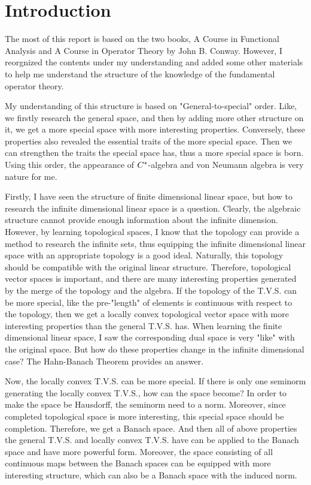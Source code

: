\chapter{Introduction}

The most of this report is based on the two books, A Course in Functional Analysis and A Course in Operator Theory by John B. Conway. However, I reorgnized the contents under my understanding and added some other materials to help me understand the structure of the knowledge of the fundamental operator theory.

 My understanding of this structure is based on "General-to-special" order. Like, we firstly research the general space, and then by adding more other structure on it, we get a more special space with more interesting properties. Conversely, these properties also revealed the essential traits of the more special space. Then we can strengthen the traits the special space has, thus a more special space is born. Using this order, the appearance of $C^{*}$-algebra and von Neumann algebra is very nature for me.

 Firstly, I have seen the structure of finite dimensional linear space, but how to research the infinite dimensional linear space is a question. Clearly, the algebraic structure cannot provide enough information about the infinite dimension. However, by learning topological spaces, I know that the topology can provide a method to research the infinite sets, thus equipping the infinite dimensional linear space with an appropriate topology is a good ideal. Naturally, this topology should be compatible with the original linear structure. Therefore, topological vector spaces is important, and there are many interesting properties generated by the merge of the topology and the algebra. If the topology of the T.V.S. can be more special, like the pre-"length" of elements is continuous with respect to the topology, then we get a locally convex topological vector space with more interesting properties than the general T.V.S. has. When learning the finite dimensional linear space, I saw the corresponding dual space is very "like" with the original space. But how do these properties change in the infinite dimensional case? The Hahn-Banach Theorem provides an answer.

 Now, the locally convex T.V.S. can be more special. If there is only one seminorm generating the locally convex T.V.S., how can the space become? In order to make the space be Hausdorff, the seminorm need to a norm. Moreover, since completed topological space is more interesting, this special space should be completion. Therefore, we get a Banach space. And then all of above properties the general T.V.S. and locally convex T.V.S. have can be applied to the Banach space and have more powerful form. Moreover, the space consisting of all continuous maps between the Banach spaces can be equipped with more interesting structure, which can also be a Banach space with the induced norm.

